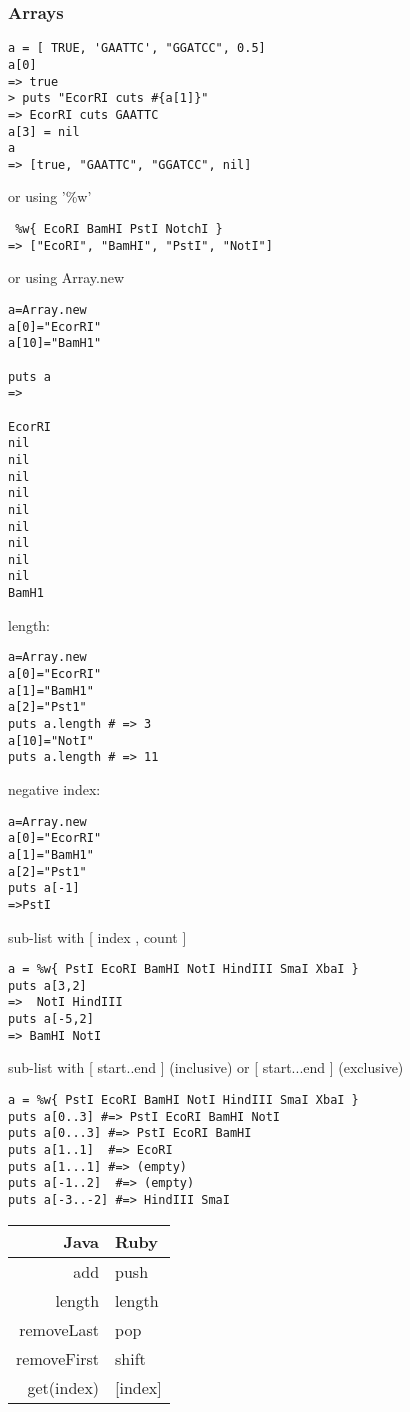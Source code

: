 \documentclass{article}
\begin{document}
\subsubsection{Arrays}

\begin{lstlisting}
a = [ TRUE, 'GAATTC', "GGATCC", 0.5]
a[0]
=> true
> puts "EcorRI cuts #{a[1]}"
=> EcorRI cuts GAATTC
a[3] = nil
a
=> [true, "GAATTC", "GGATCC", nil]
\end{lstlisting}

or using '\%w'
\begin{lstlisting}
 %w{ EcoRI BamHI PstI NotchI }
=> ["EcoRI", "BamHI", "PstI", "NotI"]
\end{lstlisting}

or using Array.new
\begin{lstlisting}
a=Array.new
a[0]="EcorRI"
a[10]="BamH1"

puts a
=> 

EcorRI
nil
nil
nil
nil
nil
nil
nil
nil
nil
BamH1
\end{lstlisting}

length:
\begin{lstlisting}
a=Array.new
a[0]="EcorRI"
a[1]="BamH1"
a[2]="Pst1"
puts a.length # => 3
a[10]="NotI"
puts a.length # => 11
\end{lstlisting}
negative index:
\begin{lstlisting}
a=Array.new
a[0]="EcorRI"
a[1]="BamH1"
a[2]="Pst1"
puts a[-1]
=>PstI
\end{lstlisting}

sub-list with [ index , count ]
\begin{lstlisting}
a = %w{ PstI EcoRI BamHI NotI HindIII SmaI XbaI }
puts a[3,2]
=>  NotI HindIII
puts a[-5,2]
=> BamHI NotI
\end{lstlisting}

sub-list with [ start..end ] (inclusive) or [ start...end ] (exclusive)
\begin{lstlisting}
a = %w{ PstI EcoRI BamHI NotI HindIII SmaI XbaI }
puts a[0..3] #=> PstI EcoRI BamHI NotI 
puts a[0...3] #=> PstI EcoRI BamHI 
puts a[1..1]  #=> EcoRI
puts a[1...1] #=> (empty)
puts a[-1..2]  #=> (empty)
puts a[-3..-2] #=> HindIII SmaI
\end{lstlisting}

\begin{tabular}{ r || l }
Java & Ruby \\
\hline                        
add & push \\
length & length \\
removeLast & pop \\
removeFirst & shift \\
get(index) & [index] \\
\end{tabular}
\end{document}
